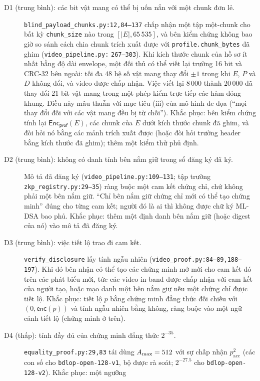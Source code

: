 \begin{description}
\item[D1 (trung bình): các bit vật mang có thể bị uốn nắn với một chunk đơn lẻ.]
  \texttt{blind\_payload\_chunks.py:12,84--137} chấp nhận một tập một-chunk cho
  bất kỳ \texttt{chunk\_size} nào trong $[|E|,65\,535]$, và bên kiểm chứng
  không bao giờ so sánh cách chia chunk trích xuất được với
  \texttt{profile.chunk\_bytes} đã ghim (\texttt{video\_pipeline.py:}
  \texttt{267--303}). Khi kích thước chunk của hồ sơ ít nhất bằng độ dài
  envelope, một đối thủ có thể viết lại trường 16 bit và CRC-32 bên ngoài: tối
  đa 48 hệ số vật mang thay đổi $\pm1$ trong khi $E$, $P$ và $D$ không đổi, và
  video được chấp nhận. Việc viết lại 8\,000 thành 20\,000 đã thay đổi 21 bit
  vật mang trong một phép kiểm trực tiếp các hàm đóng khung. Điều này mâu thuẫn
  với mục tiêu (iii) của mô hình đe dọa (``mọi thay đổi đối với các vật mang
  đều bị từ chối''). Khắc phục: bên kiểm chứng tính lại
  $\mathsf{Enc}_{\mathsf{prof}}(E)$, các chunk của $E$ dưới kích thước chunk
  đã ghim, và đòi hỏi nó bằng các mảnh trích xuất được (hoặc đòi hỏi trường
  header bằng kích thước đã ghim); thêm một kiểm thử phủ định.
\item[D2 (trung bình): không có danh tính bên nắm giữ trong sổ đăng ký đã ký.] Mô
  tả đã đăng ký (\texttt{video\_pipeline.py:109--131}; tập trường
  \texttt{zkp\_registry.py:29--35}) ràng buộc một cam kết chứng chỉ, chứ không
  phải một bên nắm giữ. ``Chỉ bên nắm giữ chứng chỉ mới có thể tạo chứng minh''
  đúng cho từng cam kết; người đó là ai thì không được chữ ký ML-DSA bao phủ.
  Khắc phục: thêm một định danh bên nắm giữ (hoặc digest của nó) vào mô tả đã
  đăng ký.
\item[D3 (trung bình): việc tiết lộ trao đi cam kết.]
  \texttt{verify\_disclosure} lấy tính ngẫu nhiên
  (\texttt{video\_proof.py:84--89,188--197}). Khi đó bên nhận có thể tạo các
  chứng minh mở mới cho cam kết đó trên các phát biểu mới, tức các video in-band
  được chấp nhận với cam kết của người tạo, hoặc mạo danh một bên nắm giữ nếu
  một chứng chỉ được tiết lộ. Khắc phục: tiết lộ $p$ bằng chứng minh đẳng thức
  đối chiếu với $(0,\mathsf{enc}(p))$ và tính ngẫu nhiên bằng không, ràng buộc
  vào một ngữ cảnh tiết lộ (chứng minh ở trên).
\item[D4 (thấp): tính đầy đủ của chứng minh đẳng thức $2^{-35}$.]
  \texttt{equality\_proof.py:29,83} tái dùng $A_{\max}=512$ với sự chấp nhận
  $p_{\mathrm{acc}}^2$ (các con số cho \texttt{bdlop-open-128-v1}, bộ được rà
  soát; $2^{-27.5}$ cho \texttt{bdlop-open-128-v2}). Khắc phục: một ngưỡng

\end{description}
